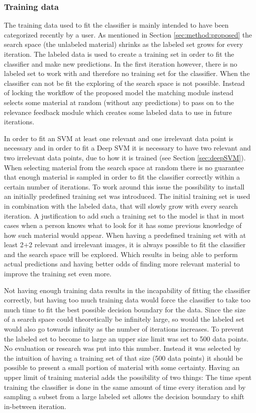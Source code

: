 \subsubsection{Training data}
\label{sec:method:proposed:matching:training}
The training data used to fit the classifier is mainly intended to have been categorized recently by a user. As mentioned in Section \ref{sec:method:proposed} the search space (the  unlabeled material) shrinks as the labeled set grows for every iteration. The labeled data is used to create a training set in order to fit the classifier and make new predictions. 
In the first iteration however, there is no labeled set to work with and therefore no training set for the classifier. When the classifier can not be fit the exploring of the search space is not possible. Instead of locking the workflow of the proposed model the matching module instead selects some material at random (without any predictions) to pass on to the relevance feedback module which creates some labeled data to use in future iterations.

In order to fit an SVM at least one relevant and one irrelevant data point is necessary and in order to fit a Deep SVM it is necessary to have two relevant and two irrelevant data points, due to how it is trained (see Section \ref{sec:deepSVM}). When selecting material from the search space at random there is no guarantee that enough material is sampled in order to fit the classifier correctly within a certain number of iterations. 
To work around this issue the possibility to install an initially predefined training set was introduced. The initial training set is used in combination with the labeled data, that will slowly grow with every search iteration. A justification to add such a training set to the model is that in most cases when a person knows what to look for it has some previous knowledge of how such material would appear. When having a predefined training set with at least 2+2 relevant and irrelevant images, it is always possible to fit the classifier and the search space will be explored. Which results in being able to perform actual predictions and having better odds of finding more relevant material to improve the training set even more.

Not having enough training data results in the incapability of fitting the classifier correctly, but having too much training data would force the classifier to take too much time to fit the best possible decision boundary for the data. Since the size of a search space could theoretically be infinitely large, so would the labeled set would also go towards infinity as the number of iterations increases. To prevent the labeled set to become to large an upper size limit was set to 500 data points. No evaluation or research was put into this number. Instead it was selected by the intuition of having a training set of that size (500 data points) it should be possible to present a small portion of material with some certainty. Having an upper limit of training material adds the possibility of two things: The time spent training the classifier is done in the same amount of time every iteration and by sampling a subset from a large labeled set allows the decision boundary to shift in-between iteration.

